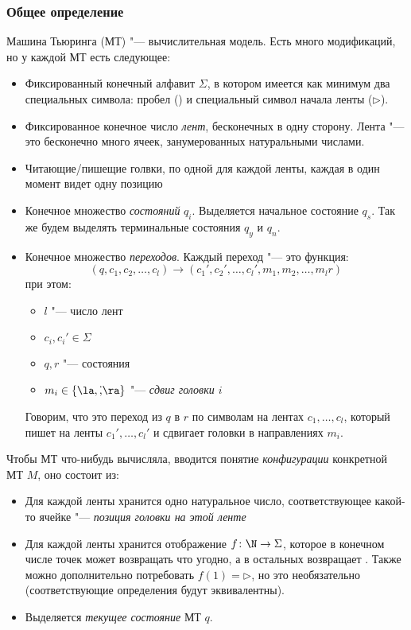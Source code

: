 \subsubsection{Общее определение}
Машина Тьюринга (МТ) "--- вычислительная модель.
Есть много модификаций, но у каждой МТ есть следующее:
\begin{itemize}
	\item
		Фиксированный конечный алфавит $\Sigma$, в котором имеется как минимум два специальных символа: пробел (\textvisiblespace) и
		специальный символ начала ленты ($\triangleright$).
	\item
		Фиксированное конечное число \textit{лент}, бесконечных в одну сторону.
		Лента "--- это бесконечно много ячеек, занумерованных натуральными числами.
	\item Читающие/пишещие голвки, по одной для каждой ленты, каждая в один момент видет одну позицию 
	\item Конечное множество \textit{состояний} $q_i$. Выделяется начальное состояние $q_s$.
		Так же будем выделять терминальные состояния $q_y$ и $q_n$.
	\item Конечное множество \textit{переходов}.
		Каждый переход "--- это функция:
		\[(q, c_1, c_2, \dots, c_l) \to (c_1', c_2', \dots, c_l', m_1, m_2, \dots, m_l r)\]
		при этом:
		\begin{itemize}
			\item $l$ "--- число лент
			\item $c_i, c_i' \in \Sigma$
			\item $q, r$ "--- состояния
			\item $m_i \in \{\la, \dot, \ra\}$ "--- \textit{сдвиг головки $i$}
		\end{itemize}
		Говорим, что это переход из $q$ в $r$ по символам на лентах $c_1, \dots, c_l$, который пишет на ленты $c_1', \dots, c_l'$
		и сдвигает головки в направлениях $m_i$.
\end{itemize}

\begin{center}
\end{center}

Чтобы МТ что-нибудь вычисляла, вводится понятие \textit{конфигурации} конкретной МТ $M$, оно состоит из:
\begin{itemize}
	\item Для каждой ленты хранится одно натуральное число, соответствующее какой-то ячейке "--- \textit{позиция головки на этой ленте}
	\item
		Для каждой ленты хранится отображение $f \colon \N \to \Sigma$, которое в конечном числе точек может возвращать что угодно, а в остальных возвращает \textvisiblespace.
		Также можно дополнительно потребовать $f(1)=\triangleright$, но это необязательно (соответствующие определения будут эквивалентны).
	\item
		Выделяется \textit{текущее состояние} МТ $q$.
\end{itemize}

